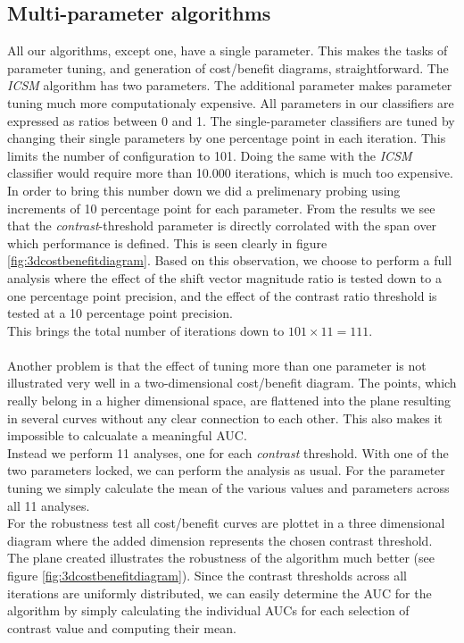 \subsection{Multi-parameter algorithms}\label{sec:ph1multiparameter}
%
All our algorithms, except one, have a single parameter. This makes the tasks of parameter tuning, and generation of cost/benefit diagrams, straightforward. The \textit{ICSM} algorithm has two parameters. The additional parameter makes parameter tuning much more computationaly expensive. All parameters in our classifiers are expressed as ratios between 0 and 1. The single-parameter classifiers are tuned by changing their single parameters by one percentage point in each iteration. This limits the number of configuration to 101. Doing the same with the \textit{ICSM} classifier would require more than 10.000 iterations, which is much too expensive.\\
In order to bring this number down we did a prelimenary probing using increments of 10 percentage point for each parameter. From the results we see that the \textit{contrast}-threshold parameter is directly corrolated with the span over which performance is defined. This is seen clearly in figure \ref{fig:3dcostbenefitdiagram}. Based on this observation, we choose to perform a full analysis where the effect of the shift vector magnitude ratio is tested down to a one percentage point precision, and the effect of the contrast ratio threshold is tested at a 10 percentage point precision.\\
This brings the total number of iterations down to $101 \times 11 = 111$.\\
\\
Another problem is that the effect of tuning more than one parameter is not illustrated very well in a two-dimensional cost/benefit diagram. The points, which really belong in a higher dimensional space, are flattened into the plane resulting in several curves without any clear connection to each other. This also makes it impossible to calcualate a meaningful AUC.\\
Instead we perform 11 analyses, one for each \textit{contrast} threshold. With one of the two parameters locked, we can perform the analysis as usual. For the parameter tuning we simply calculate the mean of the various values and parameters across all 11 analyses.\\
For the robustness test all cost/benefit curves are plottet in a three dimensional diagram where the added dimension represents the chosen contrast threshold. The plane created illustrates the robustness of the algorithm much better (see figure \ref{fig:3dcostbenefitdiagram}). Since the contrast thresholds across all iterations are uniformly distributed, we can easily determine the AUC for the algorithm by simply calculating the individual AUCs for each selection of contrast value and computing their mean.
